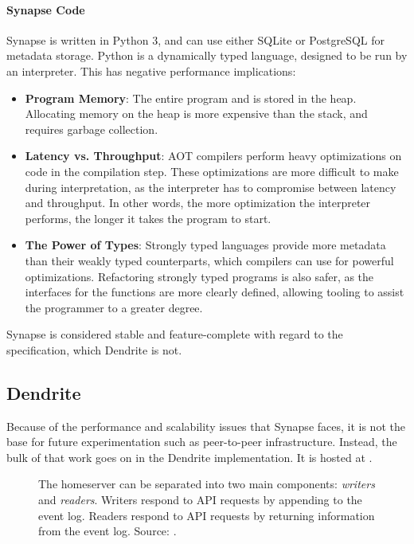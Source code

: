 \paragraph{Synapse Code}
Synapse is written in Python 3, and can use either SQLite or PostgreSQL for metadata storage.
Python is a dynamically typed language, designed to be run by an interpreter.
This has negative performance implications:
\begin{itemize}
    \item{
        \textbf{Program Memory}: 
        The entire program and is stored in the heap.
        Allocating memory on the heap is more expensive than the stack, and requires garbage collection.
    }
    \item{
        \textbf{Latency vs. Throughput}:
        \ac{AOT} compilers perform heavy optimizations on code in the compilation step.
        These optimizations are more difficult to make during interpretation, as the interpreter has to compromise between latency and throughput.
        In other words, the more optimization the interpreter performs, the longer it takes the program to start.
    }
    \item{
        \textbf{The Power of Types}:
        Strongly typed languages provide more metadata than their weakly typed counterparts, which compilers can use for powerful optimizations.
        Refactoring strongly typed programs is also safer, as the interfaces for the functions are more clearly defined, allowing tooling to assist the programmer to a greater degree.
    }
\end{itemize}

Synapse is considered stable and feature-complete with regard to the specification, which Dendrite is not.

\subsection{Dendrite}
Because of the performance and scalability issues that Synapse faces, it is not the base for future experimentation such as peer-to-peer infrastructure.
Instead, the bulk of that work goes on in the Dendrite implementation.
It is hosted at .

\begin{figure}
    \centering
    \resizebox{0.9\linewidth}{!}{}
    \caption{
        The homeserver can be separated into two main components: \textit{writers} and \textit{readers}.
        Writers respond to API requests by appending to the event log.
        Readers respond to API requests by returning information from the event log.
        Source: \cite{dendrite_design_md}.
    }
    \label{fig:dendrite_design}
\end{figure}

